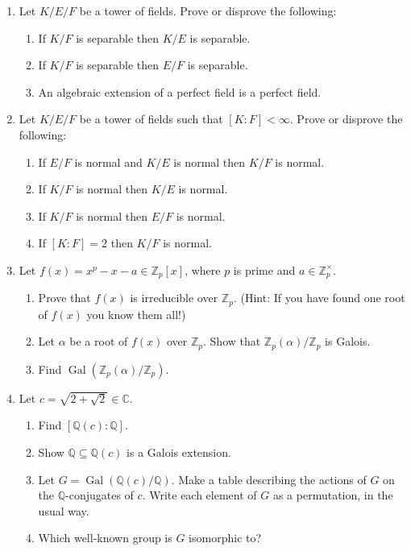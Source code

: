 \documentclass[notoc,notitlepage,nobib]{tufte-book}
\DeclareMathOperator{\Gal}{Gal}
\begin{document}
\begin{enumerate}
  \item Let $K / E / F$ be a tower of fields. Prove or disprove the following:
    \begin{enumerate}
      \item If $K / F$ is separable then $K / E$ is separable.
      \item If $K / F$ is separable then $E / F$ is separable.
      \item An algebraic extension of a perfect field is a perfect field.
    \end{enumerate}
  \item Let $K / E / F$ be a tower of fields such that $[ K : F ] < \infty$.
    Prove or disprove the following:
    \begin{enumerate}
      \item If $E / F$ is normal and $K / E$ is normal then $K / F$ is normal.
      \item If $K / F$ is normal then $K / E$ is normal.
      \item If $K / F$ is normal then $E / F$ is normal.
      \item If $[ K : F ] = 2$ then $K / F$ is normal.
    \end{enumerate}
  \item Let $f(x) = x^p - x - a \in \mathbb{Z}_p[x]$, where $p$ is prime and $a
    \in \mathbb{Z}_p^\times$.
    \begin{enumerate}
      \item Prove that $f(x)$ is irreducible over $\mathbb{Z}_p$. (Hint: If you
        have found one root of $f(x)$ you know them all!)
      \item Let $\alpha$ be a root of $f(x)$ over $\mathbb{Z}_p$. Show that
        $\mathbb{Z}_p(\alpha) / \mathbb{Z}_p$ is Galois.
      \item Find $\Gal(\mathbb{Z}_p(\alpha) / \mathbb{Z}_p)$.
    \end{enumerate}
  \item Let $c = \sqrt{2 + \sqrt{2}} \in \mathbb{C}$.
    \begin{enumerate}
      \item Find $[ \mathbb{Q}(c) : \mathbb{Q} ]$.
      \item Show $\mathbb{Q} \subseteq \mathbb{Q}(c)$ is a Galois extension.
      \item Let $G = \Gal(\mathbb{Q}(c) / \mathbb{Q})$. Make a table describing
        the actions of $G$ on the $\mathbb{Q}$-conjugates of $c$. Write each
        element of $G$ as a permutation, in the usual way.
      \item Which well-known group is $G$ isomorphic to?
    \end{enumerate}
\end{enumerate}
\end{document}
